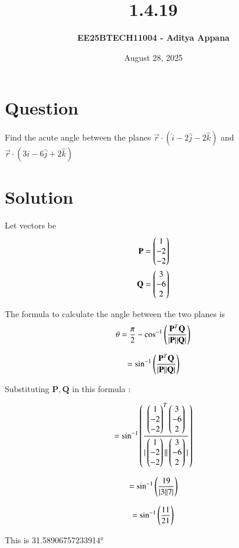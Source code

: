 \documentclass[12pt]{article}
\title{\textbf{1.4.19}}
\author{\textbf{EE25BTECH11004 - Aditya Appana}}
\date{August 28, 2025}
\begin{document}
\maketitle

\section*{Question}
Find the acute angle between the planes $ \vec{r} \cdot (\hat{i} - 2\hat{j} - 2\hat{k})$ and  $ \vec{r} \cdot (3\hat{i} - 6\hat{j} + 2\hat{k})$

\section*{Solution}
Let vectors be 
\begin{align} 
\mathbf{P}=\begin{pmatrix}1\\-2\\-2\end{pmatrix} \\
\mathbf{Q}=\begin{pmatrix}3\\-6\\2\end{pmatrix}
\end{align}

\vspace{1cm}

The formula to calculate the angle between the two planes is
\
$$ \theta = \frac{\pi}{2} - \cos^{-1}\left(\frac{\mathbf{P}^T\mathbf{Q}}{|\mathbf{P}||\mathbf{Q}|}\right)$$

$$= \sin^{-1}\left(\frac{\mathbf{P}^T\mathbf{Q}}{|\mathbf{P}||\mathbf{Q}|}\right)$$


\newpage
Substituting $\mathbf{P, Q}$ in this formula :


$$= \sin^{-1}\left(\frac{\begin{pmatrix}1\\-2\\-2\end{pmatrix}^T\begin{pmatrix}3\\-6\\2\end{pmatrix}}{|\begin{pmatrix}1\\-2\\-2\end{pmatrix}||\begin{pmatrix}3\\-6\\2\end{pmatrix}|}\right)$$


$$= \sin^{-1}\left(\frac{19}{|3||7|}\right)$$

$$= \sin^{-1}\left(\frac{11}{21}\right)$$
\vspace{1cm}

\centering
This is 31.58906757233914°
\end{document}
